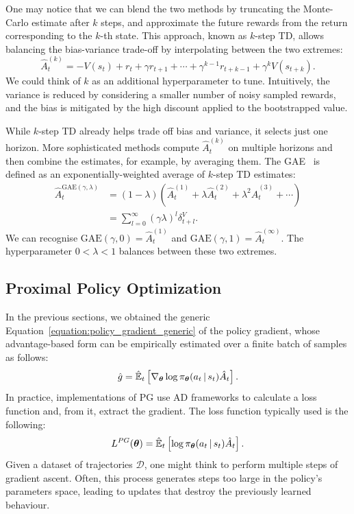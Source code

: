 One may notice that we can blend the two methods by truncating the Monte-Carlo estimate after $k$ steps, and approximate the future rewards from the return corresponding to the $k$-th state.
This approach, known as $k$-step TD, allows balancing the bias-variance trade-off by interpolating between the two extremes:
%
\begin{equation*}
    \hat{A}_t^{(k)} = -V(s_t) + r_t + \gamma r_{t+1} + \cdots + \gamma^{k-1} r_{t+k-1} + \gamma^k V(s_{t+k}) .
\end{equation*}
%
We could think of $k$ as an additional hyperparameter to tune.
Intuitively, the variance is reduced by considering a smaller number of noisy sampled rewards, and the bias is mitigated by the high discount applied to the bootstrapped value.

While $k$-step TD already helps trade off bias and variance, it selects just one horizon.
More sophisticated methods compute $\hat{A}_t^{(k)}$ on multiple horizons and then combine the estimates, for example, by averaging them.
The \ac{GAE}~\parencite{schulman_high-dimensional_2018} is defined as an exponentially-weighted average of $k$-step TD estimates:
%
\begin{align*}
    \hat{A}_t^{\text{GAE}(\gamma, \lambda)} 
    &= (1 - \lambda) \left( \hat{A}_t^{(1)} + \lambda \hat{A}_t^{(2)} + \lambda^2 \hat{A}_t^{(3)} + \cdots \right) \\
    &= \sum_{l=0}^{\infty} (\gamma \lambda)^l \delta^V_{t+l}
    .
\end{align*}
%
We can recognise $\text{GAE}(\gamma, 0) = \hat{A}_t^{(1)}$ and $\text{GAE}(\gamma, 1) = \hat{A}_t^{(\infty)}$.
The hyperparameter $0 < \lambda < 1$ balances between these two extremes.

\newpage
\subsection{Proximal Policy Optimization}
\label{sec:ppo}

In the previous sections, we obtained the generic Equation~\eqref{equation:policy_gradient_generic} of the policy gradient, whose advantage-based form can be empirically estimated over a finite batch of samples as follows:
%
\begin{equation*}
    \hat{g} = \hat{\operatorname*{\mathbb{E}}}_t \left[ \nabla_{\boldsymbol{\theta}} \log \pi_{\boldsymbol{\theta}}(a_t \operatorname{\mid} s_t) \hat{A}_t \right] .
\end{equation*}
%
In practice, implementations of \ac{PG} use \acl{AD} frameworks to calculate a loss function and, from it, extract the gradient.
The loss function typically used is the following:
%
\begin{equation}
    \label{equation:policy_gradient_loss_advantage}
    L^{PG}(\boldsymbol{\theta}) = \hat{\operatorname*{\mathbb{E}}}_t \left[ \log \pi_{\boldsymbol{\theta}}(a_t \operatorname{\mid} s_t) \hat{A}_t \right] .
\end{equation}
%
Given a dataset of trajectories $\mathcal{D}$, one might think to perform multiple steps of gradient ascent.
Often, this process generates steps too large in the policy's parameters space, leading to updates that destroy the previously learned behaviour.

